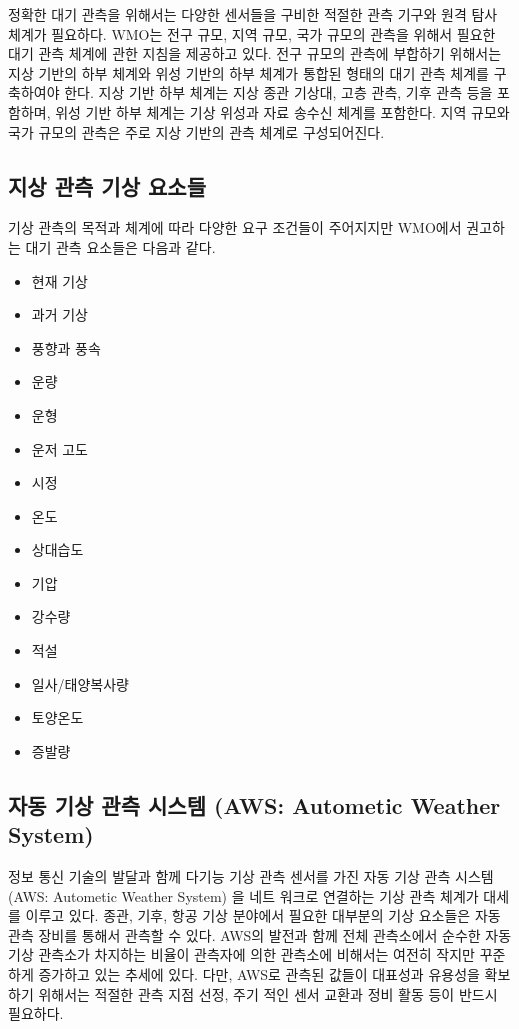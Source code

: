 정확한 대기 관측을 위해서는 다양한 센서들을 구비한 적절한 관측 기구와 원격 탐사 체계가 필요하다. WMO는 전구 규모, 지역 규모, 국가 규모의 관측을 위해서 필요한 대기 관측  체계에 관한 지침을 제공하고 있다. 전구 규모의 관측에 부합하기 위해서는 지상 기반의 하부 체계와 위성 기반의 하부 체계가 통합된 형태의 대기 관측 체계를 구축하여야 한다. 지상 기반 하부 체계는 지상 종관 기상대, 고층 관측, 기후 관측 등을 포함하며, 위성 기반 하부 체계는 기상 위성과 자료 송수신 체계를 포함한다. 지역 규모와 국가 규모의 관측은 주로 지상 기반의 관측 체계로 구성되어진다. 

\subsection{지상 관측 기상 요소들}

기상 관측의 목적과 체계에 따라 다양한 요구 조건들이 주어지지만 WMO에서 권고하는 대기 관측 요소들은 다음과 같다.

\begin{itemize}
	\item 현재 기상
	\item 과거 기상
	\item 풍향과 풍속
	\item 운량
	\item 운형
	\item 운저 고도
	\item 시정
	\item 온도
	\item 상대습도
	\item 기압
	\item 강수량
	\item 적설
	\item 일사/태양복사량
	\item 토양온도
	\item 증발량
\end{itemize}

\subsection{자동 기상 관측 시스템 (AWS: Autometic Weather System)}

정보 통신 기술의 발달과 함께 다기능 기상 관측 센서를 가진 자동 기상 관측 시스템 (AWS: Autometic Weather System) 을 네트 워크로 연결하는 기상 관측 체계가 대세를 이루고 있다. 종관, 기후, 항공 기상 분야에서 필요한 대부분의 기상 요소들은 자동 관측 장비를 통해서 관측할 수 있다. AWS의 발전과 함께 전체 관측소에서 순수한 자동기상 관측소가 차지하는 비율이 관측자에 의한 관측소에 비해서는 여전히 작지만 꾸준하게 증가하고 있는 추세에 있다. 다만, AWS로 관측된 값들이 대표성과 유용성을 확보하기 위해서는 적절한 관측 지점 선정, 주기 적인 센서 교환과 정비 활동 등이 반드시 필요하다.

